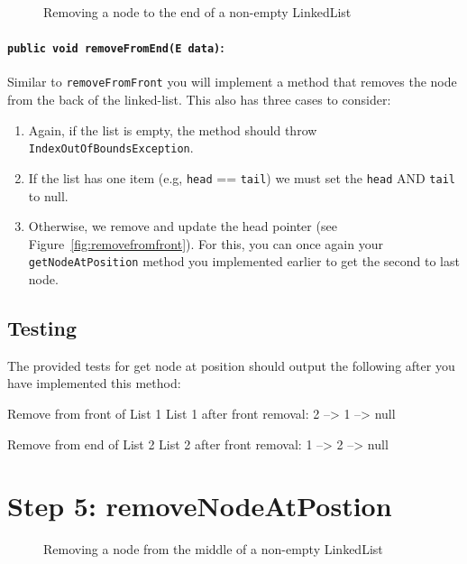 \begin{figure}[H]

\caption{Removing a node to the end of a non-empty LinkedList}
\label{fig:removefromback}
\end{figure}

\paragraph{\lstinline|public void removeFromEnd(E data)|: } Similar to
\lstinline|removeFromFront| you will implement a method that removes the node from the
back of the linked-list. This also has three cases to consider:
\begin{enumerate}
 \item Again, if the list is empty, the method should throw \lstinline|IndexOutOfBoundsException|. 
 \item If the list has one item (e.g, \lstinline|head| == \lstinline|tail|) we must set the \lstinline|head| AND \lstinline|tail| to null.
 \item Otherwise, we remove and update the head pointer (see Figure~\ref{fig:removefromfront}). For this, you can once again your \lstinline|getNodeAtPosition| method you implemented earlier to get the second to last node.
\end{enumerate}

\subsection*{Testing}
The provided tests for get node at position should output the following after you have implemented this method:
\begin{shell}
Remove from front of List 1
List 1 after front removal: 2 --> 1 --> null

Remove from end of List 2
List 2 after front removal: 1 --> 2 --> null
\end{shell}

\newpage

\section{Step 5: removeNodeAtPostion}

\begin{figure}[H]

\caption{Removing a node from the middle of a non-empty LinkedList}
\label{fig:removefrommiddle}
\end{figure}

